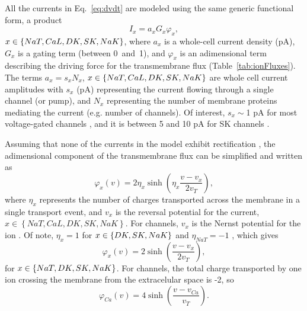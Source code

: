 \documentclass[12pt]{article}
\begin{document}
All the currents in Eq.~\eqref{eq:dvdt} are modeled using the same generic functional form, a product
\begin{equation*}
    I_x = a_x G_x    \varphi_x, 
\end{equation*}
 $x \in \left\{NaT,CaL,DK,SK,NaK\right\}$, where $a_x$ is a whole-cell current density (pA), $G_x$ is a gating term (between 0~and~1), and $\varphi_x$ is an adimensional term describing the driving force for the transmembrane flux (Table~\ref{tab:ionFluxes}). The terms $a_x= s_x N_x$, $x \in \left\{NaT,CaL,DK,SK,NaK\right\}$ are whole cell current amplitudes with
$s_x$ (pA) representing the current flowing through a single channel (or pump), and $N_x$ representing the number of membrane proteins mediating the current (e.g. {number of \K channels}). Of interest, $s_x \sim$1 pA for most voltage-gated channels \citep{hille2001ion}, and it is between 5 and 10 pA for SK channels \cite{stocker20042+}.


Assuming that  none of the currents in the model exhibit rectification  \citep{herrera2018thermodynamic}, the adimensional component of the transmembrane flux can  be simplified and written as
\begin{equation}
    \varphi_x(v) = 2\eta_x \sinh\left(\eta_x \frac{v-v_x}{2v_T}\right),
\end{equation} 
where $\eta_x$ represents the number of charges transported across the membrane in a single transport event, and $v_x$ is the reversal potential for the current,   
 $x \in \left\{NaT,CaL,DK,SK,NaK \right\}$. For channels, $v_x$ is the Nernst potential for the ion \citep{herrera2018thermodynamic}. Of note,  $\eta_x=1$ for $x \in \left\{DK,SK,NaK\right\}$ and $\eta_{NaT}=-1$   \citep{herrera2018thermodynamic}, which gives 
\begin{equation*}
    \varphi_x(v) = 2 \sinh\left( \frac{v-v_{x}}{2v_T}\right),
\end{equation*} 
for $x \in \left\{NaT,DK,SK,NaK\right\}$.
For \calcium channels, the total charge transported by one ion crossing the membrane from the extracelular space is -2, so
\begin{equation*}
    \varphi_{Ca}(v) = 4 \sinh\left( \frac{v-v_{Ca}}{v_T}\right).
\end{equation*} 
\end{document}
